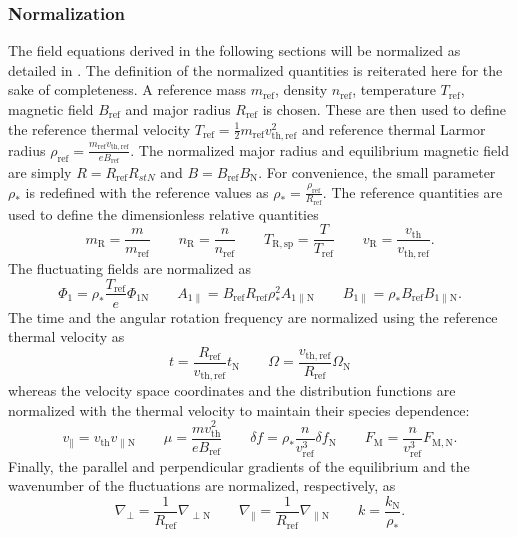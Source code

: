 \documentclass[a4paper,10pt]{article}
\newcommand{\st}[1]{\mathrm{#1}} %
\begin{document}
\subsubsection{Normalization} \label{sec:normalization}
The field equations derived in the following sections will be normalized as detailed in \cite{gkw}. The definition of the normalized quantities is reiterated here for the sake of completeness. A reference mass $m_{\st{ref}}$, density $n_{\st{ref}}$, temperature $T_{\st{ref}}$, magnetic field $B_{\st{ref}}$ and major radius $R_{\st{ref}}$ is chosen. These are then used to define the reference thermal velocity $T_{\st{ref}} = \frac{1}{2} m_{\st{ref}} v_{\st{th,ref}}^2$ and reference thermal Larmor radius $\rho_{\st{ref}} = \frac{m_{\st{ref}} v_{\st{th,ref}}}{e B_{\st{ref}}}$. The normalized major radius and equilibrium magnetic field are simply $R = R_{\st{ref}} R_{st{N}}$ and $B = B_{\st{ref}} B_{\st{N}}$. For convenience, the small parameter $\rho_*$ is redefined with the reference values as $\rho_* = \frac{\rho_{\st{ref}}}{R_{\st{ref}}}$. The reference quantities are used to define the dimensionless relative quantities
\begin{equation}
m_{\st{R}} = \frac{m}{m_{\st{ref}}} \qquad n_{\st{R}} = \frac{n}{n_{\st{ref}}} \qquad T_{\st{R,sp}} = \frac{T}{T_{\st{ref}}} \qquad v_{\st{R}} = \frac{v_{\st{th}}}{v_{\st{th,ref}}}.
\end{equation}
The fluctuating fields are normalized as
\begin{equation}
\Phi_1 = \rho_* \frac{T_{\st{ref}}}{e} \Phi_{1 \st{N}} \qquad A_{1 \parallel} = B_{\st{ref}} R_{\st{ref}} \rho_*^2 A_{1 \parallel \st{N}} \qquad B_{1 \parallel} = \rho_* B_{\st{ref}} B_{1 \parallel \st{N}}.
\end{equation}
The time and the angular rotation frequency are normalized using the reference thermal velocity as
\begin{equation}
t = \frac{R_{\st{ref}}}{v_{\st{th,ref}}} t_{\st{N}} \qquad \Omega = \frac{v_{\st{th,ref}}}{R_{\st{ref}}} \Omega_{\st{N}}
\end{equation}
whereas the velocity space coordinates and the distribution functions are normalized with the thermal velocity to maintain their species dependence:
\begin{equation}
v_{\parallel} = v_{\st{th}} v_{\parallel \st{N}} \qquad \mu = \frac{m v_{\st{th}}^2}{e B_{\st{ref}}} \qquad \delta f = \rho_* \frac{n}{v_{\st{ref}}^3} \delta f_{\st{N}} \qquad F_{\st{M}} = \frac{n}{v_{\st{ref}}^3} F_{\st{M,N}}.
\end{equation}
Finally, the parallel and perpendicular gradients of the equilibrium and the wavenumber of the fluctuations are normalized, respectively, as
\begin{equation}
\nabla_{\perp} = \frac{1}{R_{\st{ref}}} \nabla_{\perp \st{N}} \qquad \nabla_{\parallel} = \frac{1}{R_{\st{ref}}} \nabla_{\parallel \st{N}} \qquad k = \frac{k_{\st{N}}}{\rho_*}.
\end{equation}
\end{document}
